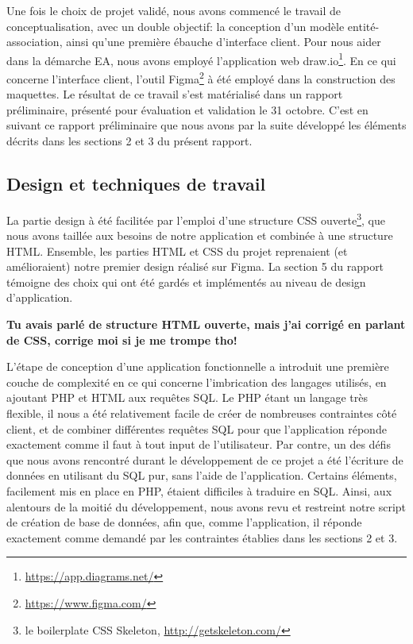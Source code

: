 \documentclass[a4paper,12pt]{article}
\begin{document}
Une fois le choix de projet validé, nous avons commencé le travail de conceptualisation, avec un double objectif: la conception d'un modèle entité-association, ainsi qu'une première ébauche d'interface client.
Pour nous aider dans la démarche EA, nous avons employé l'application web draw.io\footnote{\url{https://app.diagrams.net/}}.
En ce qui concerne l'interface client, l'outil Figma\footnote{\url{https://www.figma.com/}} à été employé dans la construction des maquettes.
Le résultat de ce travail s'est matérialisé dans un rapport préliminaire, présenté pour évaluation et validation le 31 octobre.
C'est en suivant ce rapport préliminaire  que nous avons par la suite développé les éléments décrits dans les sections 2 et 3 du présent rapport.
 
\subsection{Design et techniques de travail }

La partie design à été facilitée par l'emploi d'une structure CSS ouverte\footnote{le boilerplate CSS Skeleton, \url{http://getskeleton.com/}}, que nous avons taillée aux besoins de notre application et combinée à une structure HTML.
Ensemble, les parties HTML et CSS du projet reprenaient (et amélioraient) notre premier design réalisé sur Figma.
La section 5 du rapport témoigne des choix qui ont été gardés et implémentés au niveau de design d'application.

\textbf{Tu avais parlé de structure HTML ouverte, mais j'ai corrigé en parlant de CSS, corrige moi si je me trompe tho!}

L'étape de conception d'une application fonctionnelle a introduit une première couche de complexité en ce qui concerne l'imbrication des langages utilisés, en ajoutant PHP et HTML aux requêtes SQL.
Le PHP étant un langage très flexible, il nous a été relativement facile de créer de nombreuses contraintes côté client, et de combiner différentes requêtes SQL pour que l'application réponde exactement comme il faut à tout input de l'utilisateur. 
Par contre, un des défis que nous avons rencontré durant le développement de ce projet a été l'écriture de données en utilisant du SQL pur, sans l'aide de l'application.
Certains éléments, facilement mis en place en PHP, étaient difficiles à traduire en SQL.
Ainsi, aux alentours de la moitié du développement, nous avons revu et restreint notre script de création de base de données, afin que, comme l'application, il réponde exactement comme demandé par les contraintes établies dans les sections 2 et 3.
\end{document}
